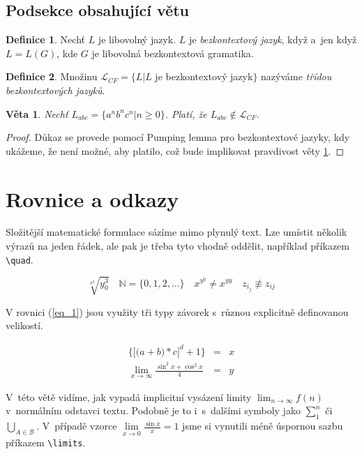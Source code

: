 \documentclass[a4paper, 11pt, twocolumn]{article}
\theoremstyle{definition}
\newtheorem{definition}{Definice}[section]
\theoremstyle{plain}
\newtheorem{sentence}{Věta}
\begin{document}
	\subsection{Podsekce obsahující větu}

	\begin{definition}
		Nechť $ L $ je libovolný jazyk. $ L $ je \emph{bezkontextový jazyk}, když a~jen když $ L = L(G) $,
		kde $ G $ je libovolná bezkontextová gramatika.
	\end{definition}

	\begin{definition}
		Množinu $ \mathcal{L}_{CF} = \{ L | L $ je bezkontextový jazyk$ \} $ nazýváme
		\emph{třídou bezkontextových jazyků}.
	\end{definition}

	\begin{sentence}
		\label{sentence_1}
		Nechť $ L_{abc} = \{ a^n b^n c^n | n \geq 0 \} $. Platí, že $ L_{abc} \notin \mathcal{L}_{CF} $.
	\end{sentence}

	\begin{proof}
		Důkaz se provede pomocí Pumping lemma pro bezkontextové jazyky, kdy ukážeme, že není možné,
		aby platilo, což bude implikovat pravdivost věty \ref{sentence_1}.
	\end{proof}


	\section{Rovnice a odkazy}

	Složitější matematické formulace sázíme mimo plynulý text. Lze umístit několik výrazů na jeden
	řádek, ale pak je třeba tyto vhodně oddělit, například příkazem \verb|\quad|.

	$$
		\sqrt[x^2]{y^3_0}
		\quad
		\mathbb{N} = \{ 0, 1, 2, \ldots \}
		\quad
		x^{y^y} \neq x^{yy}
		\quad
		z_{i_j} \not\equiv z_{ij}
	$$

	V rovnici (\ref{eq_1}) jsou využity tři typy závorek s~různou explicitně definovanou velikostí.

	\begin{eqnarray}
		\label{eq_1} \bigg\{ \Big[\big(a + b\big) * c\Big]^d + 1 \bigg\} & = & x \\
		\lim_{x\to\infty} \frac{\sin^2x + \cos^2x}{4} & = & y \nonumber
	\end{eqnarray}

	V~této větě vidíme, jak vypadá implicitní vysázení limity $ \lim_{n\to\infty} f(n) $ v~normálním
	odstavci textu. Podobně je to i~s~dalšími symboly jako $ \sum^n_1 $ či
	$ \bigcup_{A \in \mathcal{B}} $. V~případě vzorce $ \lim\limits_{x\to0} \frac{\sin x}{x} = 1 $
	jsme si vynutili méně úspornou sazbu příkazem \verb|\limits|.
\end{document}

